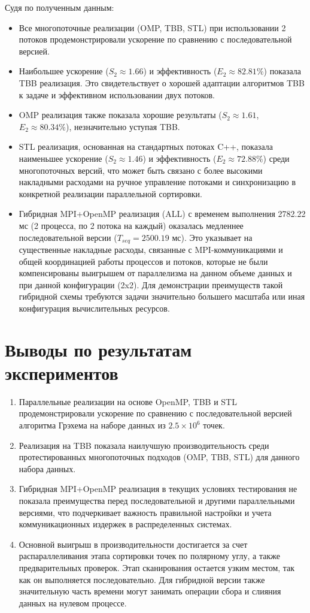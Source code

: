 \documentclass[12pt]{article}
\begin{document}
Судя по полученным данным:
\begin{itemize}
    \item Все многопоточные реализации (OMP, TBB, STL) при использовании 2 потоков продемонстрировали ускорение по сравнению с последовательной версией.
    \item Наибольшее ускорение ($S_2 \approx 1.66$) и эффективность ($E_2 \approx 82.81\%$) показала TBB реализация. Это свидетельствует о хорошей адаптации алгоритмов TBB к задаче и эффективном использовании двух потоков.
    \item OMP реализация также показала хорошие результаты ($S_2 \approx 1.61$, $E_2 \approx 80.34\%$), незначительно уступая TBB.
    \item STL реализация, основанная на стандартных потоках C++, показала наименьшее ускорение ($S_2 \approx 1.46$) и эффективность ($E_2 \approx 72.88\%$) среди многопоточных версий, что может быть связано с более высокими накладными расходами на ручное управление потоками и синхронизацию в конкретной реализации параллельной сортировки.
    \item Гибридная MPI+OpenMP реализация (ALL) с временем выполнения 2782.22 мс (2 процесса, по 2 потока на каждый) оказалась медленнее последовательной версии ($T_{seq} = 2500.19$ мс). Это указывает на существенные накладные расходы, связанные с MPI-коммуникациями и общей координацией работы процессов и потоков, которые не были компенсированы выигрышем от параллелизма на данном объеме данных и при данной конфигурации (2x2). Для демонстрации преимуществ такой гибридной схемы требуются задачи значительно большего масштаба или иная конфигурация вычислительных ресурсов.
\end{itemize}

\newpage
\section{Выводы по результатам экспериментов}
\begin{enumerate}
    \item Параллельные реализации на основе OpenMP, TBB и STL продемонстрировали ускорение по сравнению с последовательной версией алгоритма Грэхема на наборе данных из $2.5 \times 10^6$ точек.
    \item Реализация на TBB показала наилучшую производительность среди протестированных многопоточных подходов (OMP, TBB, STL) для данного набора данных.
    \item Гибридная MPI+OpenMP реализация в текущих условиях тестирования не показала преимущества перед последовательной и другими параллельными версиями, что подчеркивает важность правильной настройки и учета коммуникационных издержек в распределенных системах.
    \item Основной выигрыш в производительности достигается за счет распараллеливания этапа сортировки точек по полярному углу, а также предварительных проверок. Этап сканирования остается узким местом, так как он выполняется последовательно. Для гибридной версии также значительную часть времени могут занимать операции сбора и слияния данных на нулевом процессе.
\end{enumerate}
\end{document}

